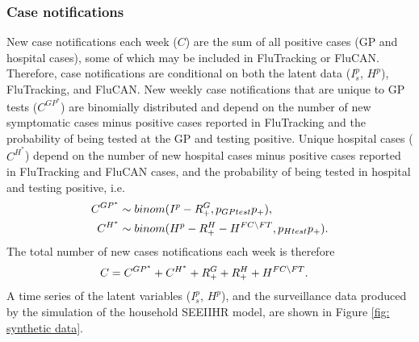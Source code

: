 \subsubsection{Case notifications}
New case notifications each week ($C$) are the sum of all positive cases (GP and hospital cases), some of which may be included in FluTracking or FluCAN. Therefore, case notifications are conditional on both the latent data ($I_s^p$, $H^p$), FluTracking, and FluCAN.
New weekly case notifications that are unique to GP tests ($C^{GP^*}$) are binomially distributed and depend on the number of new symptomatic cases minus positive cases reported in FluTracking and the probability of being tested at the GP and testing positive. Unique hospital cases ($C^{H^*}$) depend on the number of new hospital cases minus positive cases reported in FluTracking and FluCAN cases, and the probability of being tested in hospital and testing positive, i.e.
\begin{align} \notag
C^{GP^*} &\sim binom(I^p-R_{+}^G, p_{GPtest}p_{+}), \\ \notag
C^{H^*} &\sim binom(H^p-R_{+}^H-H^{FC \setminus FT}, p_{Htest}p_{+}).
\end{align}
The total number of new cases notifications each week is therefore
\begin{align} \notag
	C &= C^{GP^*} + C^{H^*} + R_{+}^{G} + R_{+}^H + H^{FC \setminus FT}.
\end{align}
\noindent A time series of the latent variables ($I_s^p$, $H^p$), and the surveillance data produced by the simulation of the household SEEIIHR model, are shown in Figure \ref{fig: synthetic data}.

